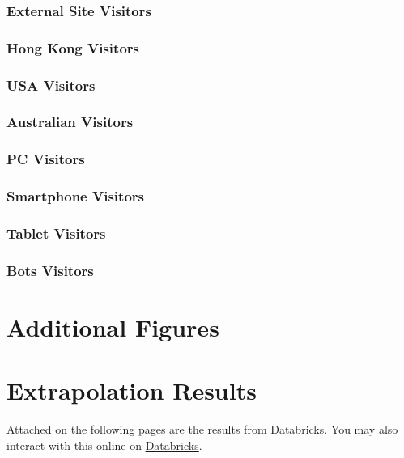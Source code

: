 \documentclass[12pt,titlepage]{article}
\begin{document}
\subsubsection{External Site Visitors}

\subsubsection{Hong Kong Visitors}

\subsubsection{USA Visitors}

\subsubsection{Australian Visitors}

\subsubsection{PC Visitors}

\subsubsection{Smartphone Visitors}

\subsubsection{Tablet Visitors}

\subsubsection{Bots Visitors}

\newpage
\appendix

\section{Additional Figures}

\clearpage


\section{Extrapolation Results}
\label{apx:results}

Attached on the following pages are the results from Databricks. You may also interact with this online on \href{https://databricks-prod-cloudfront.cloud.databricks.com/public/4027ec902e239c93eaaa8714f173bcfc/7364378259770565/3552971541306612/8155742302574378/latest.html}{Databricks}.
\end{document}
